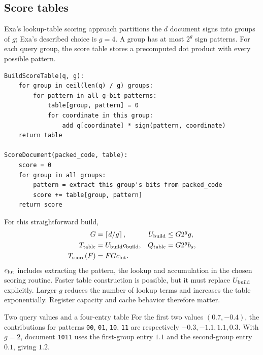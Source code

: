 \subsection{Score tables}
Exa's lookup-table scoring approach \cite{exa} partitions the $d$ document signs into
groups of $g$; Exa's described choice is $g=4$. A group has at most $2^g$ sign patterns.
For each query group, the score table stores a precomputed dot product with every possible pattern.
\par\noindent\begin{minipage}{\linewidth}
\begin{lstlisting}[caption={The score table. Padding contributes zero in the last group.}]
BuildScoreTable(q, g):
    for group in ceil(len(q) / g) groups:
        for pattern in all g-bit patterns:
            table[group, pattern] = 0
            for coordinate in this group:
                add q[coordinate] * sign(pattern, coordinate)
    return table

ScoreDocument(packed_code, table):
    score = 0
    for group in all groups:
        pattern = extract this group's bits from packed_code
        score += table[group, pattern]
    return score
\end{lstlisting}
\end{minipage}\par
For this straightforward build,
\begin{align}
G&=\left\lceil d/g\right\rceil, & U_{\rm build}&\leq G2^g g,\\
T_{\rm table}&=U_{\rm build}c_{\rm build}, & Q_{\rm table}&=G2^g b_s,\\
T_{\rm score}(F)&=F G c_{\rm lut}.&&
\label{eq:lut}
\end{align}
$c_{\rm lut}$ includes extracting the pattern, the lookup and accumulation in the chosen
scoring routine. Faster table construction is possible, but it must replace $U_{\rm build}$ explicitly.
Larger $g$ reduces the number of lookup terms and increases the table exponentially. Register
capacity and cache behavior therefore matter.

\begin{examplebox}{Two query values and a four-entry table}
For the first two values $(0.7,-0.4)$, the contributions for patterns
\texttt{00}, \texttt{01}, \texttt{10}, \texttt{11} are respectively
$-0.3,-1.1,1.1,0.3$. With $g=2$, document \texttt{1011} uses the first-group entry
$1.1$ and the second-group entry $0.1$, giving $1.2$.
\end{examplebox}

